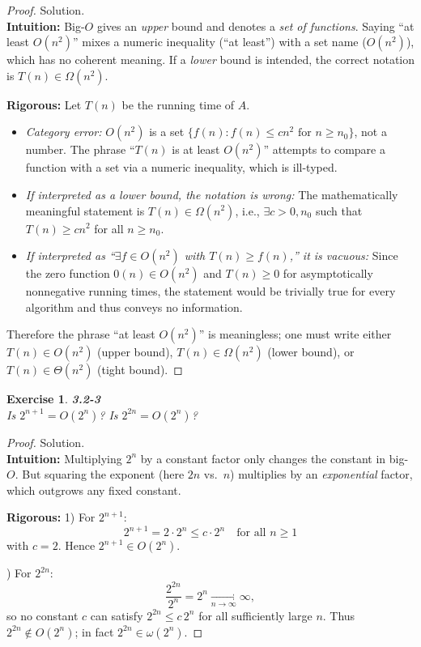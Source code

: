 \documentclass[12pt]{article}
\newtheorem{exercise}[theorem]{Exercise}
\theoremstyle{definition}
\begin{document}
\begin{proof}
Solution. \\

\noindent
\textbf{Intuition:}  
Big-$O$ gives an \emph{upper} bound and denotes a \emph{set of functions}. Saying
``at least $O(n^2)$'' mixes a numeric inequality (“at least”) with a set name
($O(n^2)$), which has no coherent meaning. If a \emph{lower} bound is intended, the
correct notation is $T(n)\in \Omega(n^2)$.

\noindent
\textbf{Rigorous:}  
Let $T(n)$ be the running time of $A$.
\begin{itemize}
  \item \emph{Category error:} $O(n^2)$ is a set $\{f(n): f(n)\le c n^2 \text{ for } n\ge n_0\}$,
  not a number. The phrase ``$T(n)$ is at least $O(n^2)$'' attempts to compare a
  function with a set via a numeric inequality, which is ill-typed.

  \item \emph{If interpreted as a lower bound, the notation is wrong:}  
  The mathematically meaningful statement is $T(n)\in\Omega(n^2)$, i.e., 
  $\exists c>0, n_0$ such that $T(n)\ge c n^2$ for all $n\ge n_0$.

  \item \emph{If interpreted as “$\exists f\in O(n^2)$ with $T(n)\ge f(n)$,” it is vacuous:}  
  Since the zero function $0(n)\in O(n^2)$ and $T(n)\ge 0$ for asymptotically nonnegative
  running times, the statement would be trivially true for every algorithm and thus conveys no information.
\end{itemize}
Therefore the phrase ``at least $O(n^2)$'' is meaningless; one must write either
$T(n)\in O(n^2)$ (upper bound), $T(n)\in \Omega(n^2)$ (lower bound), or
$T(n)\in \Theta(n^2)$ (tight bound).
\end{proof}

\newpage

\begin{exercise}
\noindent
\textbf{3.2-3} \\
Is $2^{n+1} = O(2^n)$? Is $2^{2n} = O(2^n)$?
\end{exercise}

\begin{proof}
Solution. \\

\noindent
\textbf{Intuition:}  
Multiplying $2^n$ by a constant factor only changes the constant in big-$O$.
But squaring the exponent (here $2n$ vs.\ $n$) multiplies by an
\emph{exponential} factor, which outgrows any fixed constant.

\noindent
\textbf{Rigorous:}  
1) For $2^{n+1}$:
\[
2^{n+1} = 2 \cdot 2^n \le c \cdot 2^n \quad \text{for all } n \ge 1
\]
with $c=2$. Hence $2^{n+1} \in O(2^n)$.

) For $2^{2n}$:
\[
\frac{2^{2n}}{2^n} = 2^n \xrightarrow[n\to\infty]{} \infty,
\]
so no constant $c$ can satisfy $2^{2n} \le c\,2^n$ for all sufficiently large $n$.
Thus $2^{2n} \notin O(2^n)$; in fact $2^{2n} \in \omega(2^n)$.
\end{proof}
\end{document}
